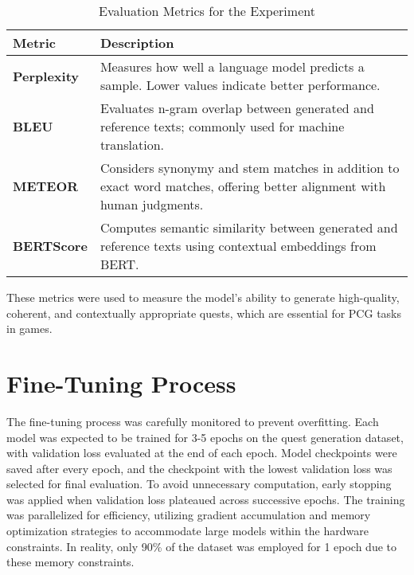 \begin{table}[H]
  \centering
  \scriptsize
  \renewcommand{\arraystretch}{1.3}
  \begin{tabularx}{0.95\textwidth}{
    >{\raggedright\arraybackslash}p{5cm}
    >{\raggedright\arraybackslash}X
  }
    \toprule
    \textbf{Metric} & \textbf{Description} \\
    \midrule
    \textbf{Perplexity} & Measures how well a language model predicts a sample. Lower values indicate better performance. \\
    \textbf{BLEU} & Evaluates n-gram overlap between generated and reference texts; commonly used for machine translation. \\
    \textbf{METEOR} & Considers synonymy and stem matches in addition to exact word matches, offering better alignment with human judgments. \\
    \textbf{BERTScore} & Computes semantic similarity between generated and reference texts using contextual embeddings from BERT. \\
    \bottomrule
  \end{tabularx}
  \caption{Evaluation Metrics for the Experiment}
\end{table}

These metrics were used to measure the model's ability to generate high-quality, coherent,
and contextually appropriate quests, which are essential for PCG tasks in games.

\section*{Fine-Tuning Process}

The fine-tuning process was carefully monitored to prevent overfitting. Each model
was expected to be trained for 3-5 epochs on the quest generation dataset, with validation
loss evaluated at the end of each epoch. Model checkpoints were saved after every epoch,
and the checkpoint with the lowest validation loss was selected for final evaluation. To
avoid unnecessary computation, early stopping was applied when validation loss plateaued
across successive epochs. The training was parallelized for efficiency, utilizing gradient
accumulation and memory optimization strategies to accommodate large models within
the hardware constraints. In reality, only 90\% of the dataset was employed for 1 epoch
due to these memory constraints.
